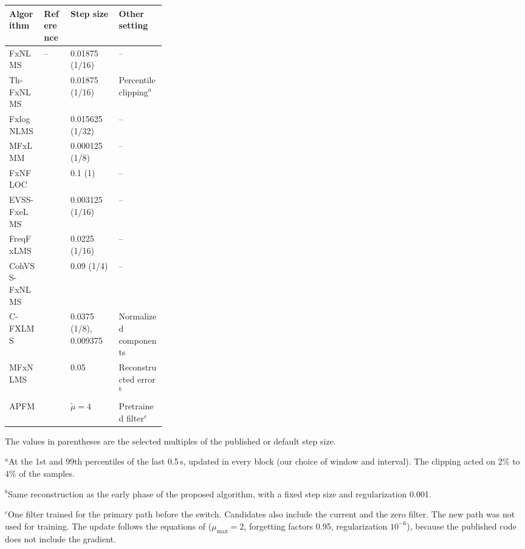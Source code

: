 \begin{table}[tbp]
\begin{tabular}{lll>{\raggedright\arraybackslash}p{0.3\linewidth}}
\toprule
Algorithm & Reference & Step size & Other setting \\
\midrule
FxNLMS & -- & 0.01875 (1/16) & -- \\
Th-FxNLMS & \cite{akhtar2008,akhtar2009} & 0.01875 (1/16) & Percentile clipping$^{a}$ \\
FxlogNLMS & \cite{wu2011} & 0.015625 (1/32) & -- \\
MFxLMM & \cite{sun2015} & 0.000125 (1/8) & -- \\
FxNFLOC & \cite{feng2024} & 0.1 (1) & -- \\
EVSS-FxeLMS & \cite{cheng2023} & 0.003125 (1/16) & -- \\
FreqFxLMS & \cite{das2007} & 0.0225 (1/16) & -- \\
CohVSS-FxNLMS & \cite{sugiura2026} & 0.09 (1/4) & -- \\
C-FXLMS & \cite{ferrer2013} & 0.0375 (1/8), 0.009375 & Normalized components \\
MFxNLMS & \cite{bjarnason1992} & 0.05 & Reconstructed error$^{b}$ \\
APFM & \cite{yin2023} & $\tilde{\mu} = 4$ & Pretrained filter$^{c}$ \\
\bottomrule
\end{tabular}
\par\medskip
\begin{minipage}{0.98\textwidth}
\scriptsize
The values in parentheses are the selected multiples of the published or default step size.\par
$^{a}$At the 1st and 99th percentiles of the last 0.5\,s, updated in every block (our choice of window and interval). The clipping acted on 2\% to 4\% of the samples.\par
$^{b}$Same reconstruction as the early phase of the proposed algorithm, with a fixed step size and regularization 0.001.\par
$^{c}$One filter trained for the primary path before the switch. Candidates also include the current and the zero filter. The new path was not used for training. The update follows the equations of \cite{yin2023} ($\mu_{\max} = 2$, forgetting factors 0.95, regularization $10^{-6}$), because the published code does not include the gradient.\par
\end{minipage}
\par{}
\end{table}
